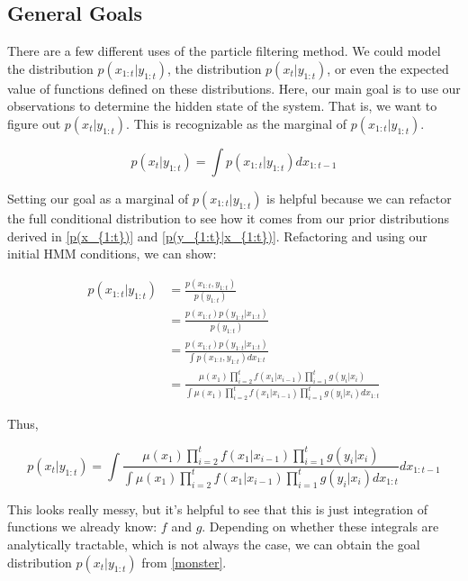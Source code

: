 \documentclass{article}
\begin{document}
\subsection{General Goals}
There are a few different uses of the particle filtering method. We could model the distribution $p(x_{1:t}|y_{1:t})$, the distribution $p(x_t|y_{1:t})$, or even the expected value of functions defined on these distributions. Here, our main goal is to use our observations to determine the hidden state of the system. That is, we want to figure out $p(x_{t}|y_{1:t})$. This is recognizable as the marginal of $p(x_{1:t}|y_{1:t})$.

\begin{equation}
p(x_{t}|y_{1:t}) = \int p(x_{1:t}|y_{1:t}) dx_{1:t-1}
\end{equation}

Setting our goal as a marginal of $p(x_{1:t}|y_{1:t})$ is helpful because we can refactor the full conditional distribution to see how it comes from our prior distributions derived in \eqref{p(x_{1:t})} and \eqref{p(y_{1:t}|x_{1:t})}. Refactoring and using our initial HMM conditions, we can show:

\begin{equation} \label{pfiltereq}
\begin{split}
p(x_{1:t}|y_{1:t}) &= \frac{p(x_{1:t},y_{1:t})}{p(y_{1:t})}\\
&= \frac{p(x_{1:t}) p(y_{1:t}|x_{1:t})}{p(y_{1:t})}\\
&= \frac{p(x_{1:t}) p(y_{1:t}|x_{1:t})}{\int p(x_{1:t},y_{1:t}) dx_{1:t}}\\
&= \frac{\mu(x_1)\prod_{i=2}^{t} f(x_1|x_{i-1})\prod_{i=1}^{t} g(y_i|x_i)}{\int \mu(x_1)\prod_{i=2}^{t} f(x_1|x_{i-1})\prod_{i=1}^{t} g(y_i|x_i) dx_{1:t}}
\end{split}
\end{equation}

\noindent
Thus,

\begin{equation} \label{monster}
p(x_t|y_{1:t}) = \int \frac{\mu(x_1)\prod_{i=2}^{t} f(x_1|x_{i-1})\prod_{i=1}^{t} g(y_i|x_i)}{\int \mu(x_1)\prod_{i=2}^{t} f(x_1|x_{i-1})\prod_{i=1}^{t} g(y_i|x_i) dx_{1:t}} dx_{1:t-1}
\end{equation}

This looks really messy, but it's helpful to see that this is just integration of functions we already know: $f$ and $g$. Depending on whether these integrals are analytically tractable, which is not always the case, we can obtain the goal distribution $p(x_t|y_{1:t})$ from \eqref{monster}.
\end{document}
